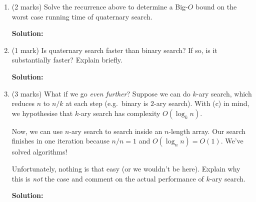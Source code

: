 \documentclass[a4,13pt]{extarticle}
\newenvironment{Solution}{\color{blue}\textbf{Solution:}}{}
\begin{document}
\begin{enumerate}
\begin{enumerate}
	      	
	      	\item (2 marks) Solve the recurrence above to determine a Big-$O$ bound on the worst case running time of quaternary search.
	      	
	      	\begin{Solution}
	      	\end{Solution}
	      	
	      	\item (1 mark) Is quaternary search faster than binary search? If so, is it substantially faster? Explain briefly.
	      	
	      	\begin{Solution}
	      	\end{Solution}
	      	      	      	                  
	      	\item (3 marks) What if we go \textit{even further}? Suppose we can do $k$-ary search, which reduces $n$ to $n/k$ at each step (e.g.\ binary is $2$-ary search). With (c) in mind, we hypothesise that $k$-ary search has complexity $O(\log_k n)$.
	      	      	      	                  
	      	      Now, we can use $n$-ary search to search inside an $n$-length array. Our search finishes in one iteration because $n/n=1$ and $O(\log_n n) = O(1)$. We've solved algorithms! 
	      	      	      	                  
	      	      Unfortunately, nothing is that easy (or we wouldn't be here). Explain why this is \textit{not} the case and comment on the actual performance of $k$-ary search.
	      	      
	      	\begin{Solution}
	      	\end{Solution}
	      	      	      	                  
	      \end{enumerate}
	      	          
\end{enumerate}
\end{document}
